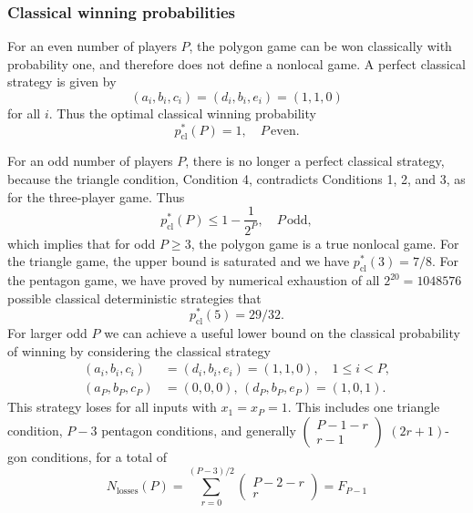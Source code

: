 \documentclass[prb,twocolumn,showpacs,amssymb,superscriptaddress]{revtex4-2}
\begin{document}
\subsubsection{Classical winning probabilities}
For an even number of players $P$, the polygon game can be won classically with probability one, and therefore does not define a nonlocal game. A perfect classical strategy is given by
\begin{equation}
(a_i,b_i,c_i) = (d_i,b_i,e_i) = (1,1,0)
\end{equation}
for all $i$. Thus the optimal classical winning probability
\begin{equation}
p^*_{\mathrm{cl}}(P) = 1, \quad P \, \mathrm{even}.
\end{equation}

For an odd number of players $P$, there is no longer a perfect classical strategy, because the triangle condition, Condition 4, contradicts Conditions 1, 2, and 3, as for the three-player game. Thus
\begin{equation}
p^*_{\mathrm{cl}}(P) \leq 1- \frac{1}{2^P}, \quad P \, \mathrm{odd},
\end{equation}
which implies that for odd $P \geq 3$, the polygon game is a true nonlocal game. For the triangle game, the upper bound is saturated and we have\cite{Bravyi} $
p^*_{\mathrm{cl}}(3) = 7/8$. For the pentagon game, we have proved by numerical exhaustion of all $2^{20} = 1048576$ possible classical deterministic strategies that
\begin{equation}
p^*_{\mathrm{cl}}(5) = 29/32.
\end{equation}
For larger odd $P$ we can achieve a useful lower bound on the classical probability of winning by considering the classical strategy
\begin{align}
\nonumber (a_i,b_i,c_i) &= (d_i,b_i,e_i) = (1,1,0), \quad 1 \leq i < P, \\
(a_P,b_P,c_P) &= (0,0,0), \, (d_P,b_P,e_P) = (1,0,1).
\end{align}
This strategy loses for all inputs with $x_1=x_P=1$. This includes one triangle condition, $P-3$ pentagon conditions, and generally $\begin{pmatrix} P-1-r \\ r-1\end{pmatrix}$ $(2r+1)$-gon conditions, for a total of
\begin{equation}
N_{\mathrm{losses}}(P) = \sum_{r=0}^{(P-3)/2} \begin{pmatrix} P -2 -r \\ r \end{pmatrix} = F_{P-1}
\end{equation}
\end{document}
